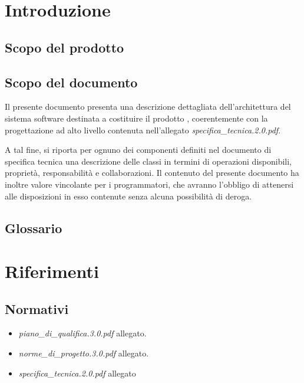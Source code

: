 

\setcounter{page}{1}
\pagestyle{normal}

\newpage

\section{Introduzione}
\subsection{Scopo del prodotto}
\purpose

\subsection{Scopo del documento}
Il presente documento presenta una descrizione dettagliata dell'architettura del sistema software destinata a costituire il prodotto \caName{}, coerentemente con la progettazione ad alto livello contenuta nell'allegato \textit{specifica\_tecnica.2.0.pdf}.

A tal fine, si riporta per ognuno dei componenti definiti nel documento di specifica tecnica una descrizione delle classi in termini di operazioni disponibili, proprietà, responsabilità e collaborazioni. Il contenuto del presente documento ha inoltre valore vincolante per i programmatori, che avranno l'obbligo di attenersi alle disposizioni in esso contenute senza alcuna possibilità di deroga.

\subsection{Glossario}
\glossaryIntro
\clearpage

\section{Riferimenti}
\subsection{Normativi}
\begin{itemize}
\item[] \textit{piano\_di\_qualifica.3.0.pdf} allegato.
\item[] \textit{norme\_di\_progetto.3.0.pdf} allegato.
\item[] \textit{specifica\_tecnica.2.0.pdf} allegato
\end{itemize}

